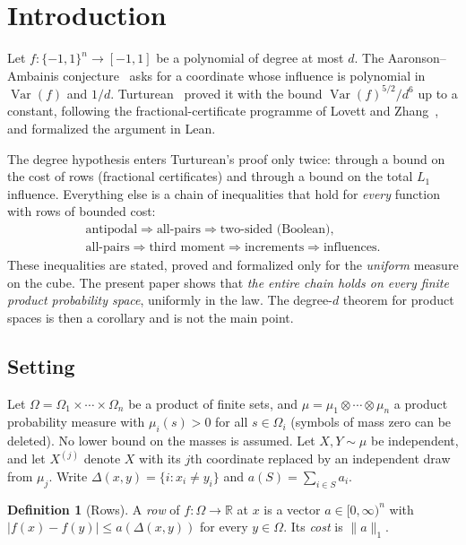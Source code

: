 \documentclass[11pt]{article}
\numberwithin{equation}{section}
\theoremstyle{definition}
\newtheorem{definition}[theorem]{Definition}
\theoremstyle{remark}
\newcommand{\R}{\mathbb{R}}
\newcommand{\1}{\mathbf 1}
\newcommand{\Var}{\operatorname{Var}}
\newcommand{\nrm}[1]{\lVert #1\rVert_1}
\begin{document}
\section{Introduction}

Let $f:\{-1,1\}^n\to[-1,1]$ be a polynomial of degree at most $d$. The Aaronson--Ambainis conjecture~\cite{AA14} asks for a coordinate whose influence is polynomial in $\Var(f)$ and $1/d$. Turturean~\cite{Tur26} proved it with the bound $\Var(f)^{5/2}/d^6$ up to a constant, following the fractional-certificate programme of Lovett and Zhang~\cite{LZ23}, and formalized the argument in Lean.

The degree hypothesis enters Turturean's proof only twice: through a bound on the cost of rows (fractional certificates) and through a bound on the total $L_1$ influence. Everything else is a chain of inequalities that hold for \emph{every} function with rows of bounded cost:
\[
\begin{gathered}\text{antipodal} \Rightarrow \text{all-pairs} \Rightarrow \text{two-sided (Boolean)},\\
\text{all-pairs} \Rightarrow \text{third moment} \Rightarrow \text{increments} \Rightarrow \text{influences}.\end{gathered}
\]
These inequalities are stated, proved and formalized only for the \emph{uniform} measure on the cube. The present paper shows that \emph{the entire chain holds on every finite product probability space}, uniformly in the law. The degree-$d$ theorem for product spaces is then a corollary and is not the main point.

\subsection{Setting}
Let $\Omega=\Omega_1\times\cdots\times\Omega_n$ be a product of finite sets, and $\mu=\mu_1\otimes\cdots\otimes\mu_n$ a product probability measure with $\mu_i(s)>0$ for all $s\in\Omega_i$ (symbols of mass zero can be deleted). No lower bound on the masses is assumed. Let $X,Y\sim\mu$ be independent, and let $X^{(j)}$ denote $X$ with its $j$th coordinate replaced by an independent draw from $\mu_j$. Write $\Delta(x,y)=\{i:x_i\ne y_i\}$ and $a(S)=\sum_{i\in S}a_i$.

\begin{definition}[Rows]
A \emph{row} of $f:\Omega\to\R$ at $x$ is a vector $a\in[0,\infty)^n$ with $|f(x)-f(y)|\le a(\Delta(x,y))$ for every $y\in\Omega$. Its \emph{cost} is $\nrm a$.
\end{definition}
\end{document}
